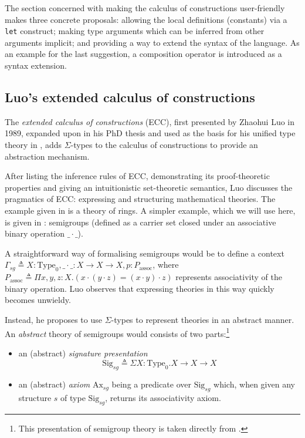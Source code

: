 \documentclass[12pt,toc=bibliography,numbers=noendperiod,
               footnotes=multiple,twoside]{scrartcl}
\begin{document}
The section concerned with making the calculus of constructions user-friendly makes three concrete proposals: allowing the local definitions (constants) via a \texttt{let} construct; making type arguments which can be inferred from other arguments implicit; and providing a way to extend the syntax of the language. As an example for the last suggestion, a composition operator is introduced as a syntax extension.


\subsection{Luo's extended calculus of constructions}

The \emph{extended calculus of constructions} (ECC), first presented by Zhaohui Luo in 1989\autocite{luo_ecc_1989}, expanded upon in his PhD thesis\autocite{luo_extended_1990} and used as the basis for his unified type theory in \autocite{luo_computation_1994}, adds \(\Sigma\)-types to the calculus of constructions to provide an abstraction mechanism.

After listing the inference rules of ECC, demonstrating its proof-theoretic properties and giving an intuitionistic set-theoretic semantics, Luo discusses the pragmatics of ECC: expressing and structuring mathematical theories. The example given in \textcite{luo_ecc_1989} is a theory of rings. A simpler example, which we will use here, is given in \textcite{luo_extended_1990}: semigroups (defined as a carrier set closed under an associative binary operation \(\_\cdot\_\)).

A straightforward way of formalising semigroups would be to define a context \(\Gamma_{sg} \triangleq X : \textrm{Type}_0, \_\cdot\_ : X \rightarrow X \rightarrow X, p : P_\textrm{assoc}\), where \(P_\textrm{assoc} \triangleq \Pi x,y,z:X.(x \cdot (y \cdot z) = (x \cdot y) \cdot z)\) represents associativity of the binary operation. Luo observes that expressing theories in this way quickly becomes unwieldy.

Instead, he proposes to use \(\Sigma\)-types to represent theories in an abstract manner. An \emph{abstract} theory of semigroups would consists of two parts:\footnote{This presentation of semigroup theory is taken directly from \textcite[100]{luo_extended_1990}.}

\begin{itemize}
\item an (abstract) \emph{signature presentation} \[\textrm{Sig}_{sg} \triangleq \Sigma X : \textrm{Type}_0. X \rightarrow X \rightarrow X\]
\item an (abstract) \emph{axiom} \(\textrm{Ax}_{sg}\) being a predicate over \(\textrm{Sig}_{sg}\) which, when given any structure \(s\) of type \(\textrm{Sig}_{sg}\), returns its associativity axiom.
\end{itemize}
\end{document}
